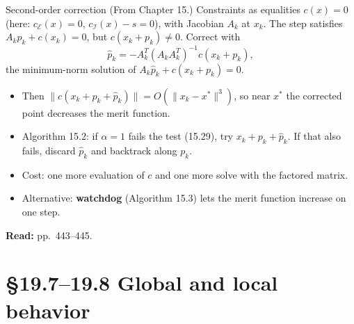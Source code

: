 \documentclass[aspectratio=169,12pt]{beamer}
\newcommand{\xs}{x^{*}}
\newcommand{\readbook}[1]{{\color{red}\textbf{Read:} #1}}
\newcommand{\cE}{\mathcal{E}}
\newcommand{\cI}{\mathcal{I}}
\newcommand{\from}[1]{{\small(From #1.)}}
\begin{document}
\begin{frame}{Second-order correction \from{Chapter 15}}
  Constraints as equalities $c(x)=0$ (here: $c_{\cE}(x)=0$, $c_{\cI}(x)-s=0$), with Jacobian $A_{k}$ at $x_{k}$.
  The step satisfies $A_{k}p_{k}+c(x_{k})=0$, but $c(x_{k}+p_{k})\ne 0$. Correct with
  \[ \hat p_{k}=-A_{k}^{T}(A_{k}A_{k}^{T})^{-1}c(x_{k}+p_{k}) , \tag{15.36} \]
  the minimum-norm solution of $A_{k}\hat p_{k}+c(x_{k}+p_{k})=0$.
  \begin{itemize}\setlength\itemsep{0.3em}
    \item Then $\|c(x_{k}+p_{k}+\hat p_{k})\|=O(\|x_{k}-\xs\|^{3})$, so near $\xs$ the corrected point decreases the
      merit function.
    \item Algorithm 15.2: if $\alpha=1$ fails the test (15.29), try $x_{k}+p_{k}+\hat p_{k}$. If that also fails,
      discard $\hat p_{k}$ and backtrack along $p_{k}$.
    \item Cost: one more evaluation of $c$ and one more solve with the factored matrix.
    \item Alternative: \textbf{watchdog} (Algorithm 15.3) lets the merit function increase on one step.
  \end{itemize}
  \readbook{pp.~443--445.}
\end{frame}

\section{\S19.7--19.8 Global and local behavior}
\end{document}
